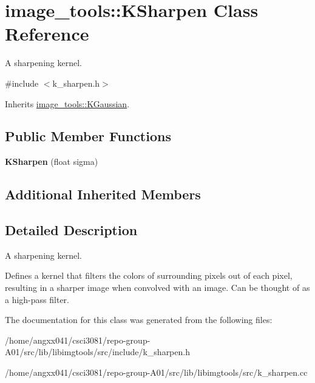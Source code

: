\hypertarget{classimage__tools_1_1KSharpen}{}\section{image\+\_\+tools\+:\+:K\+Sharpen Class Reference}
\label{classimage__tools_1_1KSharpen}


A sharpening kernel.  




{\ttfamily \#include $<$k\+\_\+sharpen.\+h$>$}



Inherits \hyperlink{classimage__tools_1_1KGaussian}{image\+\_\+tools\+::\+K\+Gaussian}.

\subsection*{Public Member Functions}
\begin{DoxyCompactItemize}
\item 
{\bfseries K\+Sharpen} (float sigma)\hypertarget{classimage__tools_1_1KSharpen_a5b50c63c031ccab6508297b4601c9f56}{}\label{classimage__tools_1_1KSharpen_a5b50c63c031ccab6508297b4601c9f56}

\end{DoxyCompactItemize}
\subsection*{Additional Inherited Members}


\subsection{Detailed Description}
A sharpening kernel. 

Defines a kernel that filters the colors of surrounding pixels out of each pixel, resulting in a sharper image when convolved with an image. Can be thought of as a high-\/pass filter. 

The documentation for this class was generated from the following files\+:\begin{DoxyCompactItemize}
\item 
/home/angxx041/csci3081/repo-\/group-\/\+A01/src/lib/libimgtools/src/include/k\+\_\+sharpen.\+h\item 
/home/angxx041/csci3081/repo-\/group-\/\+A01/src/lib/libimgtools/src/k\+\_\+sharpen.\+cc\end{DoxyCompactItemize}
